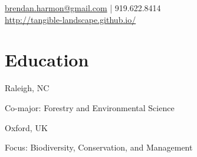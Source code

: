 \documentclass[]{baharmon_cv}
\begin{document}
%
%

%
%
{\vspace*{0.1cm} 
\href{mailto:brendan.harmon@gmail.com}{brendan.harmon@gmail.com} | 919.622.8414 \\
\url{http://tangible-landscape.github.io/} \\

}
%
%



%
%


\vspace*{0.2cm}
\section{Education} 
\begin{minipage}[t]{0.85\textwidth} 
\end{minipage}
\begin{minipage}[t]{0.15\textwidth} 
Raleigh, NC
\end{minipage}
Co-major: Forestry and Environmental Science
\vspace*{0.1cm}

\begin{minipage}[t]{0.85\textwidth} 
\end{minipage}
\begin{minipage}[t]{0.15\textwidth} 
Oxford, UK
\end{minipage}
Focus: Biodiversity, Conservation, and Management
\vspace*{0.1cm}
\end{document}
